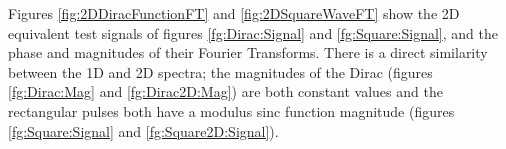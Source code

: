 Figures \ref{fig:2DDiracFunctionFT} and \ref{fig:2DSquareWaveFT} show the 2D equivalent test signals of figures \ref{fg:Dirac:Signal} and \ref{fg:Square:Signal}, and the phase and magnitudes of their Fourier Transforms. There is a direct similarity between the 1D and 2D spectra; the magnitudes of the Dirac (figures \ref{fg:Dirac:Mag} and \ref{fg:Dirac2D:Mag}) are both constant values and the rectangular pulses both have a modulus sinc function magnitude (figures \ref{fg:Square:Signal} and \ref{fg:Square2D:Signal}). 

\begin{figure}
\centering
{}

\end{figure}
